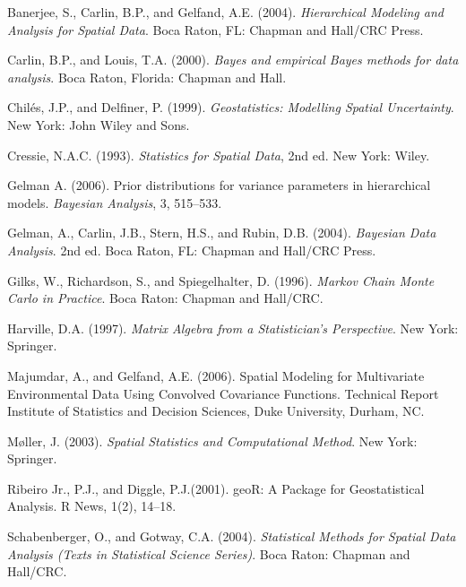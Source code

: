 \documentclass[a4paper]{article}
\begin{document}
\begin{description}
\item Banerjee, S., Carlin, B.P., and Gelfand, A.E. (2004). \emph{Hierarchical Modeling and Analysis for Spatial Data}. Boca Raton, FL: Chapman and Hall/CRC Press.

\item Carlin, B.P., and Louis, T.A. (2000). \emph{Bayes and empirical Bayes methods for data analysis}. Boca Raton, Florida: Chapman and Hall.

\item Chil\'es, J.P., and Delfiner, P. (1999). \emph{Geostatistics: Modelling Spatial Uncertainty}. New York: John Wiley and Sons.

\item Cressie, N.A.C. (1993). \emph{Statistics for Spatial Data}, 2nd ed. New York: Wiley.

\item Gelman A. (2006). Prior distributions for variance parameters in hierarchical models. \emph{Bayesian Analysis}, 3, 515–533.

\item Gelman, A., Carlin, J.B., Stern, H.S., and Rubin, D.B. (2004). \emph{Bayesian Data Analysis}. 2nd ed. Boca Raton, FL: Chapman and Hall/CRC Press.

\item Gilks, W., Richardson, S., and Spiegelhalter, D. (1996). \emph{Markov Chain Monte Carlo in Practice}. Boca Raton: Chapman and Hall/CRC.

\item Harville, D.A. (1997). \emph{Matrix Algebra from a Statistician's Perspective}. New York: Springer.

\item Majumdar, A., and Gelfand, A.E. (2006). Spatial Modeling for Multivariate Environmental Data Using Convolved Covariance Functions. Technical Report Institute of Statistics and Decision Sciences, Duke University, Durham, NC.

\item M{\o}ller, J. (2003). \emph{Spatial Statistics and Computational Method}. New York: Springer.

\item Ribeiro Jr., P.J., and Diggle, P.J.(2001). geoR: A Package for Geostatistical Analysis. R News, 1(2), 14–18.

\item Schabenberger, O., and Gotway, C.A. (2004). \emph{Statistical Methods for Spatial Data Analysis (Texts in Statistical Science Series)}. Boca Raton: Chapman and Hall/CRC.


\end{description}
\end{document}

